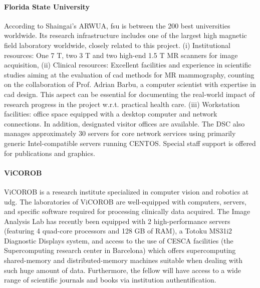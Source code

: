 \paragraph{Florida State University} 
According to Shaingai's ARWUA, \ac{fsu} is between the 200 best universities worldwide. 
Its research infrastructure includes one of the largest high magnetic field laboratory worldwide, closely related to this project. 
(i) Institutional resources: One 7 T, two 3 T and two high-end 1.5 T MR scanners for image acquisition,
(ii) Clinical resources: Excellent facilities and experience in scientific studies aiming at the evaluation of \ac{cad} methods for MR mammography, counting on the collaboration of Prof. Adrian Barbu, a computer scientist with expertise in \ac{cad} design. 
This aspect can be essential for documenting the real-world impact of research progress in the project w.r.t. practical health care. 
(iii) Workstation facilities: office space equipped with a desktop computer and network connections. 
In addition, designated visitor offices are available. 
The DSC also manages approximately 30 servers for core network services using primarily generic Intel-compatible servers running CENTOS. 
Special staff support is offered for publications and graphics.

\paragraph{ViCOROB}
ViCOROB is a research institute specialized in computer vision and robotics at \ac{udg}.
The laboratories of ViCOROB are well-equipped with computers, servers, and specific software required for processing clinically data acquired. 
The Image Analysis Lab has recently been equipped with 2 high-performance servers (featuring 4 quad-core processors and 128 GB of RAM), a Totoku MS31i2 Diagnostic Displays system, and access to the use of CESCA facilities (the Supercomputing research center in Barcelona) which offers supercomputing shared-memory and distributed-memory machines suitable when dealing with such huge amount of data.
Furthermore, the fellow will have access to a wide range of scientific journals and books via institution authentification.


